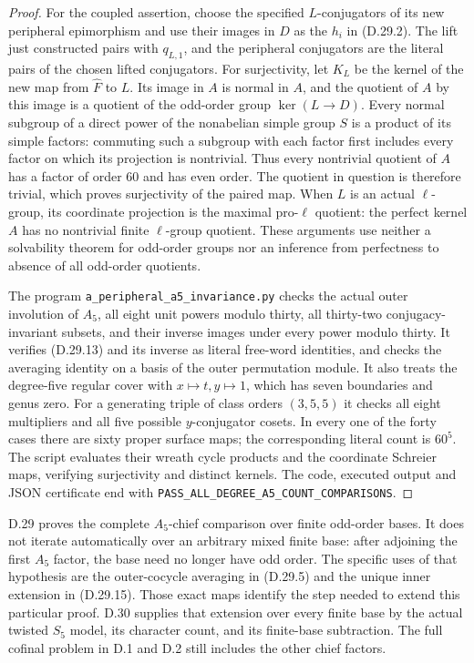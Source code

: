 \begin{proof}
For the coupled assertion, choose the specified
$L$-conjugators of its new peripheral epimorphism
and use their images in $D$ as the $h_i$ in
\textup{(D.29.2)}.  The lift just constructed
pairs with $q_{L,1}$, and
the peripheral conjugators are the literal
pairs of the chosen lifted conjugators.
For surjectivity, let $K_L$ be the kernel of the
new map from $\widehat F$ to $L$.  Its image in $A$
is normal in $A$, and the quotient of $A$ by this
image is a quotient of the odd-order group
$\ker(L\to D)$.  Every normal subgroup of a direct
power of the nonabelian simple group $S$ is a
product of its simple factors: commuting such a
subgroup with each factor first includes every
factor on which its projection is nontrivial.
Thus every nontrivial quotient of $A$ has a
factor of order $60$ and has even order.
The quotient in question is therefore trivial,
which proves surjectivity of the paired map.
When $L$ is an actual $\ell$-group, its coordinate
projection is the maximal pro-$\ell$ quotient:
the perfect kernel $A$ has no nontrivial finite
$\ell$-group quotient.  These arguments use
neither a solvability theorem for odd-order
groups nor an inference from perfectness to
absence of all odd-order quotients.

The program \texttt{a\_peripheral\_a5\_invariance.py}
checks the actual outer involution of $A_5$,
all eight unit powers modulo thirty, all
thirty-two conjugacy-invariant subsets, and
their inverse images under every power modulo thirty.
It verifies \textup{(D.29.13)} and its inverse
as literal free-word identities, and checks
the averaging identity on a basis of the
outer permutation module.
It also treats the degree-five regular cover
with $x\mapsto t,y\mapsto1$, which has seven
boundaries and genus zero.  For a generating
triple of class orders $(3,5,5)$ it checks
all eight multipliers and all five possible
$y$-conjugator cosets.  In every one of the
forty cases there are sixty proper surface
maps; the corresponding literal count is
$60^5$.  The script evaluates their wreath
cycle products and the coordinate Schreier
maps, verifying surjectivity and distinct
kernels.  The code, executed output and
JSON certificate end with
\texttt{PASS\_ALL\_DEGREE\_A5\_COUNT\_COMPARISONS}.
\end{proof}

D.29 proves the complete $A_5$-chief comparison
over finite odd-order bases.  It does not
iterate automatically over an arbitrary
mixed finite base: after adjoining the
first $A_5$ factor, the base need no longer
have odd order.  The specific uses of
that hypothesis are the outer-cocycle
averaging in \textup{(D.29.5)} and the
unique inner extension in
\textup{(D.29.15)}.  Those exact maps
identify the step needed to extend this
particular proof.  D.30 supplies that
extension over every finite base by the
actual twisted $S_5$ model, its character
count, and its finite-base subtraction.
The full cofinal problem in D.1 and D.2
still includes the other chief factors.
